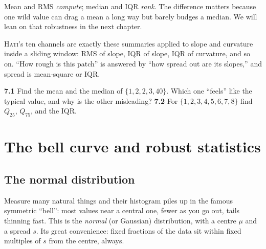 \documentclass[11pt,oneside]{book}
\begin{document}
\begin{intuition}
Mean and RMS \emph{compute}; median and IQR \emph{rank}. The difference matters because
one wild value can drag a mean a long way but barely budges a median. We will lean on
that robustness in the next chapter.
\end{intuition}

\begin{hatibox}
\textsc{Hati}'s ten channels are exactly these summaries applied to slope and curvature
inside a sliding window: RMS of slope, IQR of slope, IQR of curvature, and so on. ``How
rough is this patch'' is answered by ``how spread out are its slopes,'' and spread is
mean-square or IQR.
\end{hatibox}

\begin{practice}
\textbf{7.1} Find the mean and the median of $\{1,2,2,3,40\}$. Which one ``feels'' like
the typical value, and why is the other misleading? \quad\textbf{7.2} For
$\{1,2,3,4,5,6,7,8\}$ find $Q_{25}$, $Q_{75}$, and the IQR.
\end{practice}

\chapter{The bell curve and robust statistics}

\section{The normal distribution}
Measure many natural things and their histogram piles up in the famous symmetric
``bell'': most values near a central one, fewer as you go out, tails thinning fast.
This is the \emph{normal} (or Gaussian) distribution, with a centre $\mu$ and a spread
$s$. Its great convenience: fixed fractions of the data sit within fixed multiples of
$s$ from the centre, always.

\begin{center}
\end{center}
\end{document}
